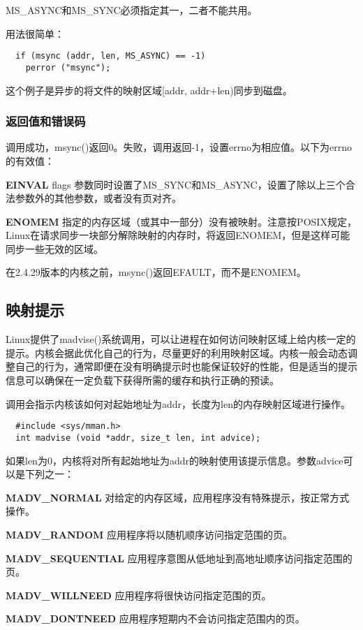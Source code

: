 MS\_ASYNC和MS\_SYNC必须指定其一，二者不能共用。

用法很简单：

\begin{lstlisting}
  if (msync (addr, len, MS_ASYNC) == -1)
    perror ("msync");
\end{lstlisting}

这个例子是异步的将文件的映射区域[addr, addr+len)同步到磁盘。

\subsubsection{返回值和错误码}

调用成功，msync()返回0。失败，调用返回-1，设置errno为相应值。以下为errno的有效值：

\begin{eqlist*}
\item[\textbf{EINVAL}] flags 参数同时设置了MS\_SYNC和MS\_ASYNC，设置了除以上三个合法参数外的其他参数，或者没有页对齐。
\item[\textbf{ENOMEM}] 指定的内存区域（或其中一部分）没有被映射。注意按POSIX规定，Linux在请求同步一块部分解除映射的内存时，将返回ENOMEM，但是这样可能同步一些无效的区域。
\end{eqlist*}

在2.4.29版本的内核之前，msync()返回EFAULT，而不是ENOMEM。

\subsection{映射提示}

Linux提供了madvise()系统调用，可以让进程在如何访问映射区域上给内核一定的提示。内核会据此优化自己的行为，尽量更好的利用映射区域。内核一般会动态调整自己的行为，通常即便在没有明确提示时也能保证较好的性能，但是适当的提示信息可以确保在一定负载下获得所需的缓存和执行正确的预读。

调用会指示内核该如何对起始地址为addr，长度为len的内存映射区域进行操作。

\begin{lstlisting}
  #include <sys/mman.h>
  int madvise (void *addr, size_t len, int advice);
\end{lstlisting}

如果len为0，内核将对所有起始地址为addr的映射使用该提示信息。参数advice可以是下列之一：

\begin{eqlist*}
\item[\textbf{MADV\_NORMAL}] 对给定的内存区域，应用程序没有特殊提示，按正常方式操作。
\item[\textbf{MADV\_RANDOM}] 应用程序将以随机顺序访问指定范围的页。
\item[\textbf{MADV\_SEQUENTIAL}] 应用程序意图从低地址到高地址顺序访问指定范围的页。
\item[\textbf{MADV\_WILLNEED}] 应用程序将很快访问指定范围的页。
\item[\textbf{MADV\_DONTNEED}] 应用程序短期内不会访问指定范围内的页。
\end{eqlist*}


